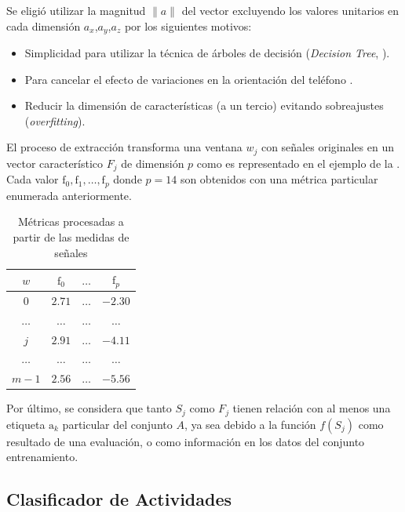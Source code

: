 Se eligió utilizar la magnitud $\lVert a\rVert$ del vector excluyendo
los valores unitarios en cada dimensión $a_{x}$,$a_{y}$,$a_{z}$
por los siguientes motivos:
\begin{itemize}
\item Simplicidad para utilizar la técnica de árboles de decisión (\emph{Decision
Tree}, ).
\item Para cancelar el efecto de variaciones en la orientación del teléfono
\cite{Schneider2014}.
\item Reducir la dimensión de características (a un tercio) evitando sobreajustes
(\emph{overfitting}).
\end{itemize}
El proceso de extracción transforma una ventana $w_{j}$ con señales
originales en un vector característico $F_{j}$ de dimensión $p$
como es representado en el ejemplo de la .
Cada valor $\mathrm{f}_{0},\mathrm{f}_{1},\ldots,\mathrm{f}_{p}$
donde $p=14$ son obtenidos con una métrica particular enumerada anteriormente.

\begin{table}[!tbph]
\begin{centering}
\begin{tabular}{|c|c|c|c|}
\hline 
$w$ & $\mathrm{f}_{0}$ & $\ldots$ & $\mathrm{f}_{p}$\tabularnewline
\hline 
\hline 
$0$ & $2.71$ & \texttt{$\ldots$} & \texttt{$-2.30$}\tabularnewline
\hline 
$\ldots$ & $\ldots$ & \texttt{$\ldots$} & \texttt{$\ldots$}\tabularnewline
\hline 
$j$ & $2.91$ & \texttt{$\ldots$} & \texttt{$-4.11$}\tabularnewline
\hline 
$\ldots$ & $\ldots$ & \texttt{$\ldots$} & \texttt{$\ldots$}\tabularnewline
\hline 
$m-1$ & $2.56$ & \texttt{$\ldots$} & \texttt{$-5.56$}\tabularnewline
\hline 
\end{tabular}
\par\end{centering}
\caption[Métricas de proceso de extracción]{\label{tab4:features}Métricas procesadas a partir de las medidas
de señales}
\end{table}

Por último, se considera que tanto $S_{j}$ como $F_{j\ensuremath{}}$
tienen relación con al menos una etiqueta $\mathrm{a}_{k}$ particular
del conjunto $A$, ya sea debido a la función $f(S_{j})$ como resultado
de una evaluación, o como información en los datos del conjunto entrenamiento.

\subsection{Clasificador de Actividades }

